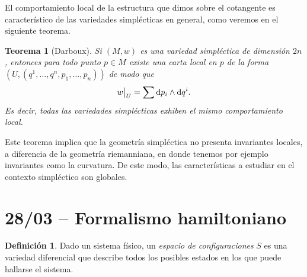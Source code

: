 \documentclass[11pt, a4paper]{article}
\newcommand{\dd}{\mathrm{d}}
\theoremstyle{plain}
\newtheorem{thm}[prop]{Teorema}
\theoremstyle{definition}
\newtheorem{defn}[prop]{Definición}
\begin{document}
El comportamiento local de la estructura que dimos sobre el cotangente es característico de las variedades simplécticas en general, como veremos en el siguiente teorema.

\begin{thm}[Darboux] Si $(M,w)$ es una variedad simpléctica de dimensión $2n$, entonces para todo punto $p\in M$ existe una carta local en $p$ de la forma $\left(U, (q^1,\dots,q^n,p_1,\dots,p_n)\right)$ de modo que
\[w\big{|}_U = \sum \dd p_i\wedge \dd q^i.\]
Es decir, todas las variedades simplécticas exhiben el mismo comportamiento local. \hfill\qedsymbol
\end{thm}

Este teorema implica que la geometría simpléctica no presenta invariantes locales, a diferencia de la geometría riemanniana, en donde tenemos por ejemplo invariantes como la curvatura. De este modo, las características a estudiar en el contexto simpléctico son globales.

\section{28/03 -- Formalismo hamiltoniano}

\begin{defn} Dado un sistema físico, un \emph{espacio de configuraciones} $S$ es una variedad diferencial que describe todos los posibles estados en los que puede hallarse el sistema.
\end{defn}
\end{document}
